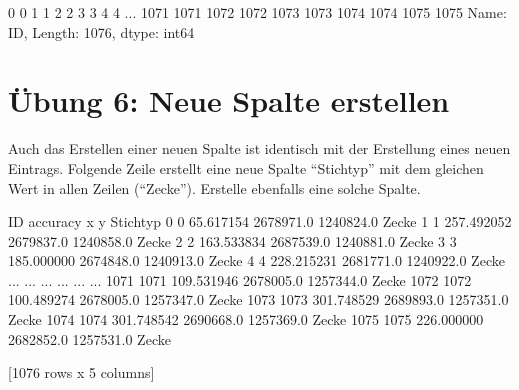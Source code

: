 \documentclass[letterpaper,10pt,english]{sphinxmanual}
\begin{document}
\begin{sphinxVerbatim}[commandchars=\\\{\}]
\PYG{p}{[}\PYG{p}{]}
\end{sphinxVerbatim}

\begin{sphinxVerbatim}[commandchars=\\\{\}]
0          0
1          1
2          2
3          3
4          4
        ... 
1071    1071
1072    1072
1073    1073
1074    1074
1075    1075
Name: ID, Length: 1076, dtype: int64
\end{sphinxVerbatim}


\section{Übung 6: Neue Spalte erstellen}
\label{\detokenize{01_04_Tabellarische_Daten:ubung-6-neue-spalte-erstellen}}
Auch das Erstellen einer neuen Spalte ist identisch mit der Erstellung eines neuen  Eintrags. Folgende Zeile erstellt eine neue Spalte “Stichtyp” mit dem gleichen Wert in allen Zeilen (“Zecke”). Erstelle ebenfalls eine solche Spalte.

\begin{sphinxVerbatim}[commandchars=\\\{\}]
\PYG{p}{[}\PYG{p}{]}  

\end{sphinxVerbatim}

\begin{sphinxVerbatim}[commandchars=\\\{\}]
        ID    accuracy          x          y Stichtyp
0        0   65.617154  2678971.0  1240824.0    Zecke
1        1  257.492052  2679837.0  1240858.0    Zecke
2        2  163.533834  2687539.0  1240881.0    Zecke
3        3  185.000000  2674848.0  1240913.0    Zecke
4        4  228.215231  2681771.0  1240922.0    Zecke
...    ...         ...        ...        ...      ...
1071  1071  109.531946  2678005.0  1257344.0    Zecke
1072  1072  100.489274  2678005.0  1257347.0    Zecke
1073  1073  301.748529  2689893.0  1257351.0    Zecke
1074  1074  301.748542  2690668.0  1257369.0    Zecke
1075  1075  226.000000  2682852.0  1257531.0    Zecke

[1076 rows x 5 columns]
\end{sphinxVerbatim}
\end{document}
